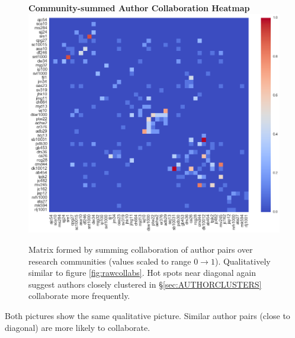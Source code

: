   \begin{figure}
  \centering
  \textbf{Community-summed Author Collaboration Heatmap}
    \includegraphics[width=\textwidth]{Analysis/comm_collabs.png}
    \caption[Community-summed Author Collaboration Heatmap]{Matrix formed by summing collaboration of author pairs over research communities (values scaled to range $0 \rightarrow 1$). Qualitatively similar to figure \ref{fig:rawcollabs}. Hot spots near diagonal again suggest authors closely clustered in \S\ref{sec:AUTHORCLUSTERS} collaborate more frequently.}
      \label{fig:collcollabs}
\end{figure}
Both pictures show the same qualitative picture. Similar author pairs (close to diagonal) are more likely to collaborate. 

